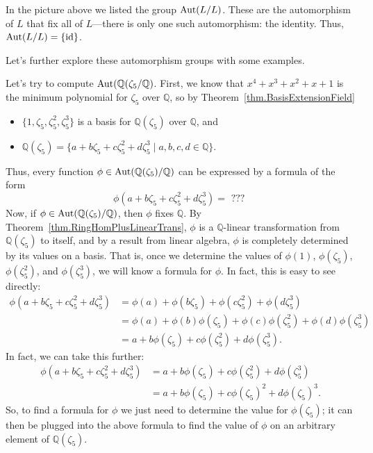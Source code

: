 In the picture above we listed the group $\operatorname{Aut}(L/L)$. These are the automorphism of $L$ that fix all of $L$---there is only one such automorphism: the identity. Thus, $\operatorname{Aut}(L/L) = \{\text{id}\}$. 

Let's further explore these automorphism groups with some examples.

\begin{example}\label{exam.AutQAdjoinZeta5OverQ}
Let's try to compute $\operatorname{Aut}(\mathbb{Q}(\zeta_5/\mathbb{Q})$. First, we know that $x^4+x^3+x^2+x+1$ is the minimum polynomial for $\zeta_5$ over $\mathbb{Q}$, so by Theorem~\ref{thm.BasisExtensionField}  
\begin{itemize}
\item $\{1,\zeta_5,\zeta_5^2,\zeta_5^3\}$ is a basis for $\mathbb{Q}(\zeta_5)$ over $\mathbb{Q}$, and 
\item  $\mathbb{Q}(\zeta_5) = \{a+b\zeta_5+c\zeta_5^2+d\zeta_5^3\mid a,b,c,d\in \mathbb{Q}\}.$
\end{itemize}
Thus, every function $\phi\in \operatorname{Aut}(\mathbb{Q}(\zeta_5)/\mathbb{Q})$ can be expressed by a formula of the form \[\phi(a+b\zeta_5+c\zeta_5^2+d\zeta_5^3) = \text{ ??? }\]
Now, if $\phi\in \operatorname{Aut}(\mathbb{Q}(\zeta_5)/\mathbb{Q})$, then $\phi$ fixes $\mathbb{Q}$. By Theorem~\ref{thm.RingHomPlusLinearTrans}, $\phi$ is a $\mathbb{Q}$-linear transformation from $\mathbb{Q}(\zeta_5)$ to itself, and by a result from linear algebra, $\phi$ is completely determined by its values on a basis. That is, once we determine the values of $\phi(1)$, $\phi(\zeta_5)$, $\phi(\zeta_5^2)$, and $\phi(\zeta_5^3)$,  we will know a formula for $\phi$. In fact, this is easy to see directly: 
\begin{align*}
\phi(a+b\zeta_5+c\zeta_5^2+d\zeta_5^3) 
&= \phi(a)+\phi(b\zeta_5)+\phi(c\zeta_5^2)+\phi(d\zeta_5^3)\\
&= \phi(a)+\phi(b)\phi(\zeta_5)+\phi(c)\phi(\zeta_5^2)+\phi(d)\phi(\zeta_5^3)\\
&= a+b\phi(\zeta_5)+c\phi(\zeta_5^2)+d\phi(\zeta_5^3).
\end{align*}
In fact, we can take this further:
\begin{align*}
\phi(a+b\zeta_5+c\zeta_5^2+d\zeta_5^3)
&= a+b\phi(\zeta_5)+c\phi(\zeta_5^2)+d\phi(\zeta_5^3)\\
&= a+b\phi(\zeta_5)+c\phi(\zeta_5)^2+d\phi(\zeta_5)^3.
\end{align*}
So, to find a formula for $\phi$ we just need to determine the value for $\phi(\zeta_5)$; it can then be plugged into the above formula to find the value of $\phi$ on an arbitrary element of  $\mathbb{Q}(\zeta_5)$.


\end{example}
